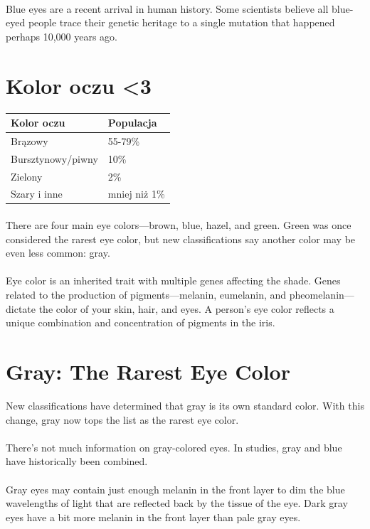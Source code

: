 \documentclass[12pt]{article}
\begin{document}
\paragraph{}
Blue eyes are a recent arrival in human history. Some scientists believe all blue-eyed people trace their genetic heritage to a single mutation that happened perhaps 10,000 years ago.\cite{fiolet}

\section{Kolor oczu \textless3}

\begin{tabular}{l|l}
Kolor oczu 				& Populacja\\\hline
Brązowy 					& 55-79\%\\
Bursztynowy\slash piwny 	& 10\%\\
Zielony 					& 2\%\\
Szary i inne 				& mniej niż 1\%\\
\end{tabular}
\paragraph{}
There are four main eye colors—brown, blue, hazel, and green. Green was once considered the rarest eye color, but new classifications say another color may be even less common: gray.
\paragraph{}
Eye color is an inherited trait with multiple genes affecting the shade. Genes related to the production of pigments—melanin, eumelanin, and pheomelanin—dictate the color of your skin, hair, and eyes. A person's eye color reflects a unique combination and concentration of pigments in the iris.

\section{Gray: The Rarest Eye Color}
New classifications have determined that gray is its own standard color. With this change, gray now tops the list as the rarest eye color.
\paragraph{}
There's not much information on gray-colored eyes. In studies, gray and blue have historically been combined.
\paragraph{}
Gray eyes may contain just enough melanin in the front layer to dim the blue wavelengths of light that are reflected back by the tissue of the eye. Dark gray eyes have a bit more melanin in the front layer than pale gray eyes. 
\end{document}
